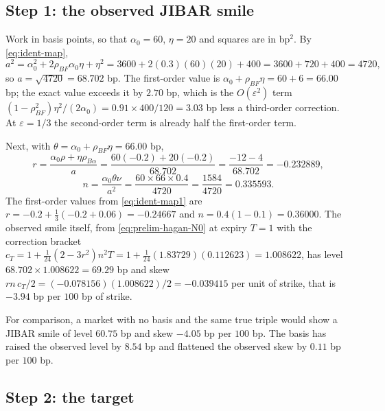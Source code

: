 \documentclass[../../../main.tex]{subfiles}
\begin{document}

\subsection{Step 1: the observed JIBAR smile}

Work in basis points, so that $\alpha_0=60$, $\eta=20$ and squares are in bp$^2$. By \eqref{eq:ident-map},
\[
a^2=\alpha_0^2+2\rho_{BF}\alpha_0\eta+\eta^2=3600+2(0.3)(60)(20)+400=3600+720+400=4720,
\]
so $a=\sqrt{4720}=68.702$ bp. The first-order value is $\alpha_0+\rho_{BF}\eta=60+6=66.00$ bp; the exact value exceeds it by $2.70$ bp, which is the $O(\varepsilon^2)$ term $(1-\rho_{BF}^2)\eta^2/(2\alpha_0)=0.91\times400/120=3.03$ bp less a third-order correction. At $\varepsilon=1/3$ the second-order term is already half the first-order term.

Next, with $\theta=\alpha_0+\rho_{BF}\eta=66.00$ bp,
\[
r=\frac{\alpha_0\rho+\eta\rho_{B\alpha}}{a}=\frac{60(-0.2)+20(-0.2)}{68.702}=\frac{-12-4}{68.702}=-0.232889,
\]
\[
n=\frac{\alpha_0\theta\nu}{a^2}=\frac{60\times66\times0.4}{4720}=\frac{1584}{4720}=0.335593 .
\]
The first-order values from \eqref{eq:ident-map1} are $r=-0.2+\tfrac13(-0.2+0.06)=-0.24667$ and $n=0.4(1-0.1)=0.36000$. The observed smile itself, from \eqref{eq:prelim-hagan-N0} at expiry $T=1$ with the correction bracket $c_T=1+\tfrac1{24}(2-3r^2)n^2T=1+\tfrac1{24}(1.83729)(0.112623)=1.008622$, has level $68.702\times1.008622=69.29$ bp and skew $rn\,c_T/2=(-0.078156)(1.008622)/2=-0.039415$ per unit of strike, that is $-3.94$ bp per $100$ bp of strike.

For comparison, a market with no basis and the same true triple would show a JIBAR smile of level $60.75$ bp and skew $-4.05$ bp per $100$ bp. The basis has raised the observed level by $8.54$ bp and flattened the observed skew by $0.11$ bp per $100$ bp.

\subsection{Step 2: the target}
\end{document}
